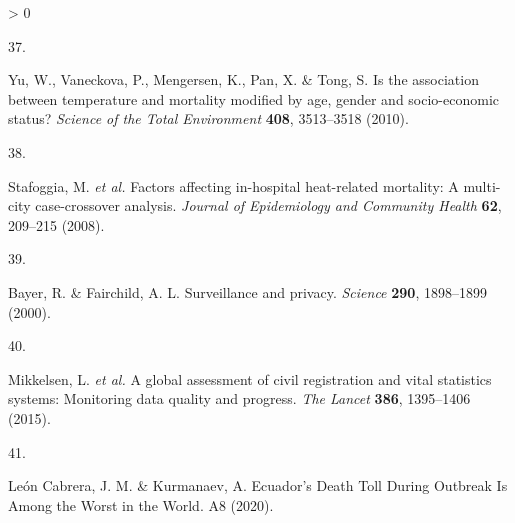 \documentclass[
]{article}
\newlength{\cslhangindent}
\newlength{\csllabelwidth}
\newenvironment{CSLReferences}[2] %
 {%
  \setlength{\parindent}{0pt}
  \ifodd #1 \everypar{\setlength{\hangindent}{\cslhangindent}}\ignorespaces\fi
  \ifnum #2 > 0
  \setlength{\parskip}{#2\baselineskip}
  \fi
 }%
 {}
\newcommand{\CSLLeftMargin}[1]{\parbox[t]{\csllabelwidth}{#1}}
\newcommand{\CSLRightInline}[1]{\parbox[t]{\linewidth - \csllabelwidth}{#1}\break}
\begin{document}
\begin{CSLReferences}{0}{0}
\leavevmode\hypertarget{ref-Yu2010}{}%
\CSLLeftMargin{37. }
\CSLRightInline{Yu, W., Vaneckova, P., Mengersen, K., Pan, X. \& Tong, S. {Is the association between temperature and mortality modified by age, gender and socio-economic status?} \emph{Science of the Total Environment} \textbf{408}, 3513--3518 (2010).}

\leavevmode\hypertarget{ref-Stafoggia2008}{}%
\CSLLeftMargin{38. }
\CSLRightInline{Stafoggia, M. \emph{et al.} {Factors affecting in-hospital heat-related mortality: A multi-city case-crossover analysis}. \emph{Journal of Epidemiology and Community Health} \textbf{62}, 209--215 (2008).}

\leavevmode\hypertarget{ref-Bayer2000}{}%
\CSLLeftMargin{39. }
\CSLRightInline{Bayer, R. \& Fairchild, A. L. {Surveillance and privacy}. \emph{Science} \textbf{290}, 1898--1899 (2000).}

\leavevmode\hypertarget{ref-Mikkelsen2015}{}%
\CSLLeftMargin{40. }
\CSLRightInline{Mikkelsen, L. \emph{et al.} {A global assessment of civil registration and vital statistics systems: Monitoring data quality and progress}. \emph{The Lancet} \textbf{386}, 1395--1406 (2015).}

\leavevmode\hypertarget{ref-LeonCabrera2020}{}%
\CSLLeftMargin{41. }
\CSLRightInline{León Cabrera, J. M. \& Kurmanaev, A. {Ecuador's Death Toll During Outbreak Is Among the Worst in the World}. A8 (2020).}

\end{CSLReferences}
\end{document}

